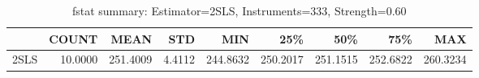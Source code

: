 \begin{table}[ht]
\centering
\caption{fstat summary: Estimator=2SLS, Instruments=333, Strength=0.60}
\begin{tabular}{lrrrrrrrr}
\toprule
 & COUNT & MEAN & STD & MIN & 25\% & 50\% & 75\% & MAX \\
\midrule
2SLS & 10.0000 & 251.4009 & 4.4112 & 244.8632 & 250.2017 & 251.1515 & 252.6822 & 260.3234 \\
\bottomrule
\end{tabular}
\end{table}
